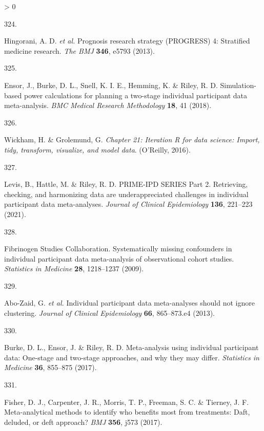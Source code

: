 \documentclass[a4paper, twoside]{templates/ociamthesis}
\newlength{\cslhangindent}
\newlength{\csllabelwidth}
\newenvironment{CSLReferences}[3] %
 {%
  \setlength{\parindent}{0pt}
  \ifodd #1 \everypar{\setlength{\hangindent}{\cslhangindent}}\ignorespaces\fi
  \ifnum #2 > 0
  \setlength{\parskip}{#2\baselineskip}
  \fi
 }%
 {}
\newcommand{\CSLLeftMargin}[1]{\parbox[t]{\maxof{\widthof{#1}}{\csllabelwidth}}{#1}}
\newcommand{\CSLRightInline}[1]{\parbox[t]{\linewidth - \csllabelwidth}{#1}}
\begin{document}
\begin{CSLReferences}{0}{0}
\leavevmode\hypertarget{ref-hingorani2013}{}%
\CSLLeftMargin{324. }
\CSLRightInline{Hingorani, A. D. \emph{et al.} Prognosis research strategy ({PROGRESS}) 4: Stratified medicine research. \emph{The BMJ} \textbf{346}, e5793 (2013).}

\leavevmode\hypertarget{ref-ensor2018}{}%
\CSLLeftMargin{325. }
\CSLRightInline{Ensor, J., Burke, D. L., Snell, K. I. E., Hemming, K. \& Riley, R. D. Simulation-based power calculations for planning a two-stage individual participant data meta-analysis. \emph{BMC Medical Research Methodology} \textbf{18}, 41 (2018).}

\leavevmode\hypertarget{ref-wickham2016func}{}%
\CSLLeftMargin{326. }
\CSLRightInline{Wickham, H. \& Grolemund, G. \emph{Chapter 21: Iteration \textbar{} {R} for data science: Import, tidy, transform, visualize, and model data}. ({O'Reilly}, 2016).}

\leavevmode\hypertarget{ref-levis2021}{}%
\CSLLeftMargin{327. }
\CSLRightInline{Levis, B., Hattle, M. \& Riley, R. D. {PRIME}-{IPD SERIES Part} 2. {Retrieving}, checking, and harmonizing data are underappreciated challenges in individual participant data meta-analyses. \emph{Journal of Clinical Epidemiology} \textbf{136}, 221--223 (2021).}

\leavevmode\hypertarget{ref-fibrinogenstudiescollaboration2009}{}%
\CSLLeftMargin{328. }
\CSLRightInline{Fibrinogen Studies Collaboration. Systematically missing confounders in individual participant data meta-analysis of observational cohort studies. \emph{Statistics in Medicine} \textbf{28}, 1218--1237 (2009).}

\leavevmode\hypertarget{ref-abo-zaid2013}{}%
\CSLLeftMargin{329. }
\CSLRightInline{Abo-Zaid, G. \emph{et al.} Individual participant data meta-analyses should not ignore clustering. \emph{Journal of Clinical Epidemiology} \textbf{66}, 865--873.e4 (2013).}

\leavevmode\hypertarget{ref-burke2017}{}%
\CSLLeftMargin{330. }
\CSLRightInline{Burke, D. L., Ensor, J. \& Riley, R. D. Meta-analysis using individual participant data: One-stage and two-stage approaches, and why they may differ. \emph{Statistics in Medicine} \textbf{36}, 855--875 (2017).}

\leavevmode\hypertarget{ref-fisher2017}{}%
\CSLLeftMargin{331. }
\CSLRightInline{Fisher, D. J., Carpenter, J. R., Morris, T. P., Freeman, S. C. \& Tierney, J. F. Meta-analytical methods to identify who benefits most from treatments: Daft, deluded, or deft approach? \emph{BMJ} \textbf{356}, j573 (2017).}


\end{CSLReferences}
\end{document}
